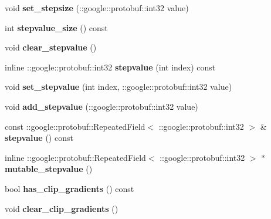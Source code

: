 \begin{DoxyCompactItemize}
void {\bfseries set\+\_\+stepsize} (\+::google\+::protobuf\+::int32 value)
\item 
\mbox{\label{classcaffe_1_1_solver_parameter_abb416cc00ea121c5ccb2a37a687c9618}} 
int {\bfseries stepvalue\+\_\+size} () const
\item 
\mbox{\label{classcaffe_1_1_solver_parameter_a41612c04774a8d8f3929df47526ab341}} 
void {\bfseries clear\+\_\+stepvalue} ()
\item 
\mbox{\label{classcaffe_1_1_solver_parameter_ad9423ccd9d72973dc6fbf31b9a4c5eb4}} 
inline \+::google\+::protobuf\+::int32 {\bfseries stepvalue} (int index) const
\item 
\mbox{\label{classcaffe_1_1_solver_parameter_a25677beacf1289c7bc6a3d617a53e0c7}} 
void {\bfseries set\+\_\+stepvalue} (int index, \+::google\+::protobuf\+::int32 value)
\item 
\mbox{\label{classcaffe_1_1_solver_parameter_aeff64dfb4acef425f23cb3273af31eb8}} 
void {\bfseries add\+\_\+stepvalue} (\+::google\+::protobuf\+::int32 value)
\item 
\mbox{\label{classcaffe_1_1_solver_parameter_ab4b939f8fe66280b0d9384d54edf16d0}} 
const \+::google\+::protobuf\+::\+Repeated\+Field$<$ \+::google\+::protobuf\+::int32 $>$ \& {\bfseries stepvalue} () const
\item 
\mbox{\label{classcaffe_1_1_solver_parameter_ae1ae5717b3729664b6029e4ed738c72d}} 
inline \+::google\+::protobuf\+::\+Repeated\+Field$<$ \+::google\+::protobuf\+::int32 $>$ $\ast$ {\bfseries mutable\+\_\+stepvalue} ()
\item 
\mbox{\label{classcaffe_1_1_solver_parameter_a3d6f97ba8d4e920bef781400c6e84162}} 
bool {\bfseries has\+\_\+clip\+\_\+gradients} () const
\item 
\mbox{\label{classcaffe_1_1_solver_parameter_a4fc718dc9480ba25190f394543cb4c56}} 
void {\bfseries clear\+\_\+clip\+\_\+gradients} ()

\end{DoxyCompactItemize}
